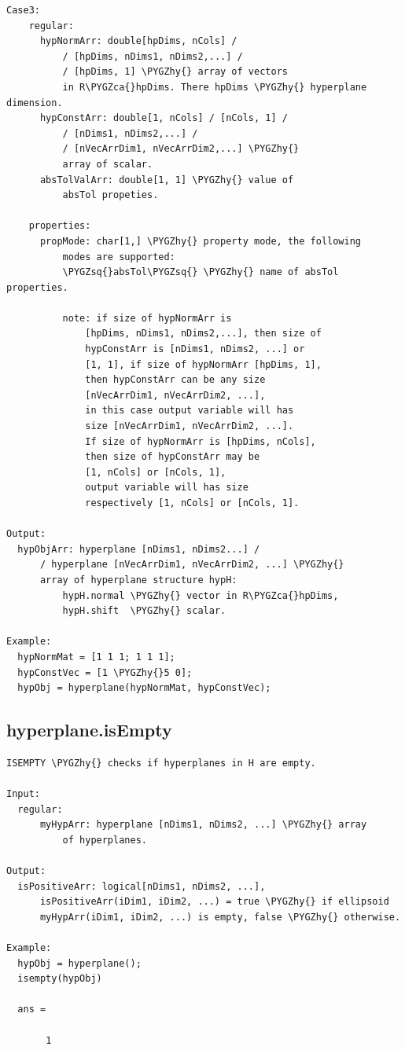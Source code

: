 \documentclass[letterpaper,10pt,english]{sphinxmanual}
\def\PYGZca{\char`\^}
\def\PYGZhy{\char`\-}
\def\PYGZsq{\char`\'}
\begin{document}
\begin{Verbatim}[commandchars=\\\{\}]
  Case3:
    regular:
      hypNormArr: double[hpDims, nCols] /
          / [hpDims, nDims1, nDims2,...] /
          / [hpDims, 1] \PYGZhy{} array of vectors
          in R\PYGZca{}hpDims. There hpDims \PYGZhy{} hyperplane dimension.
      hypConstArr: double[1, nCols] / [nCols, 1] /
          / [nDims1, nDims2,...] /
          / [nVecArrDim1, nVecArrDim2,...] \PYGZhy{}
          array of scalar.
      absTolValArr: double[1, 1] \PYGZhy{} value of
          absTol propeties.

    properties:
      propMode: char[1,] \PYGZhy{} property mode, the following
          modes are supported:
          \PYGZsq{}absTol\PYGZsq{} \PYGZhy{} name of absTol properties.

          note: if size of hypNormArr is
              [hpDims, nDims1, nDims2,...], then size of
              hypConstArr is [nDims1, nDims2, ...] or
              [1, 1], if size of hypNormArr [hpDims, 1],
              then hypConstArr can be any size
              [nVecArrDim1, nVecArrDim2, ...],
              in this case output variable will has
              size [nVecArrDim1, nVecArrDim2, ...].
              If size of hypNormArr is [hpDims, nCols],
              then size of hypConstArr may be
              [1, nCols] or [nCols, 1],
              output variable will has size
              respectively [1, nCols] or [nCols, 1].

Output:
  hypObjArr: hyperplane [nDims1, nDims2...] /
      / hyperplane [nVecArrDim1, nVecArrDim2, ...] \PYGZhy{}
      array of hyperplane structure hypH:
          hypH.normal \PYGZhy{} vector in R\PYGZca{}hpDims,
          hypH.shift  \PYGZhy{} scalar.

Example:
  hypNormMat = [1 1 1; 1 1 1];
  hypConstVec = [1 \PYGZhy{}5 0];
  hypObj = hyperplane(hypNormMat, hypConstVec);
\end{Verbatim}


\subsection{hyperplane.isEmpty}
\label{chap_functions:hyperplane-isempty}
\begin{Verbatim}[commandchars=\\\{\}]
ISEMPTY \PYGZhy{} checks if hyperplanes in H are empty.

Input:
  regular:
      myHypArr: hyperplane [nDims1, nDims2, ...] \PYGZhy{} array
          of hyperplanes.

Output:
  isPositiveArr: logical[nDims1, nDims2, ...],
      isPositiveArr(iDim1, iDim2, ...) = true \PYGZhy{} if ellipsoid
      myHypArr(iDim1, iDim2, ...) is empty, false \PYGZhy{} otherwise.

Example:
  hypObj = hyperplane();
  isempty(hypObj)

  ans =

       1
\end{Verbatim}
\end{document}
